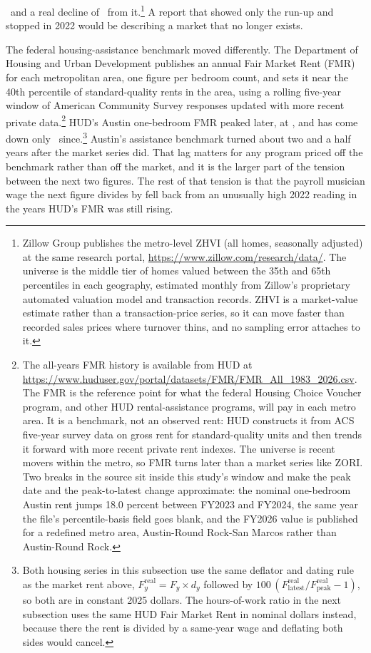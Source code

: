 \NColZhviAustinPeak\ and a real decline of
\NColZhviAustinPeaktolatest\ from it.\footnote{Zillow Group publishes the
metro-level ZHVI (all homes, seasonally adjusted) at the same research portal,
\url{https://www.zillow.com/research/data/}. The universe is the middle tier
of homes valued between the 35th and 65th percentiles in each geography,
estimated monthly from Zillow's proprietary automated valuation model and
transaction records. ZHVI is a market-value estimate rather than a
transaction-price series, so it can move faster than recorded sales prices
where turnover thins, and no sampling error attaches to it.} A report that
showed only the run-up and stopped in 2022 would be describing a market that
no longer exists.

The federal housing-assistance benchmark moved differently. The Department
of Housing and Urban Development publishes an annual Fair Market Rent (FMR)
for each metropolitan area, one figure per bedroom count, and sets it near
the 40th percentile of standard-quality rents in the area, using a rolling
five-year window of American Community Survey responses updated with more
recent private data.\footnote{The all-years FMR history is available from
HUD at \url{https://www.huduser.gov/portal/datasets/FMR/FMR_All_1983_2026.csv}.
The FMR is the reference point for what the federal Housing Choice Voucher
program, and other HUD rental-assistance programs, will pay in each metro
area. It is a benchmark, not an observed rent: HUD constructs it from ACS
five-year survey data on gross rent for standard-quality units and then
trends it forward with more recent private rent indexes. The universe is
recent movers within the metro, so FMR turns later than a market series like
ZORI. Two breaks in the source sit inside this study's window and make the
peak date and the peak-to-latest change approximate: the nominal one-bedroom
Austin rent jumps 18.0 percent between FY2023 and FY2024, the same year the
file's percentile-basis field goes blank, and the FY2026 value is published
for a redefined metro area, Austin-Round Rock-San Marcos rather than
Austin-Round Rock.} HUD's Austin one-bedroom FMR peaked later, at
\NColHudBrOneAustinPeak, and has come down only
\NColHudBrOneAustinPeaktolatest\ since.\footnote{Both housing series in this
subsection use the same deflator and dating rule as the market rent above,
\(F^{\mathrm{real}}_y = F_y \times d_y\) followed by
\(100\,(F^{\mathrm{real}}_{\mathrm{latest}}/F^{\mathrm{real}}_{\mathrm{peak}}
   - 1)\), so both are in constant 2025 dollars. The hours-of-work ratio in
the next subsection uses the same HUD Fair Market Rent in nominal dollars
instead, because there the rent is divided by a same-year wage and deflating
both sides would cancel.} Austin's assistance benchmark turned about two and
a half years after the market series did. That lag matters for any program
priced off the benchmark rather than off the market, and it is the larger
part of the tension between the next two figures. The rest of that tension is
that the payroll musician wage the next figure divides by fell back from an
unusually high 2022 reading in the years HUD's FMR was still rising.


